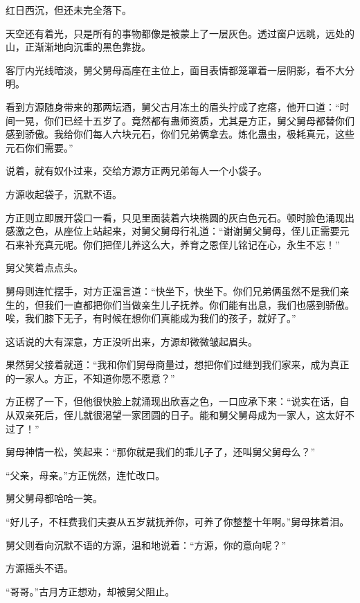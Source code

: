 
\begin{this_body}



红日西沉，但还未完全落下。

天空还有着光，只是所有的事物都像是被蒙上了一层灰色。透过窗户远眺，远处的山，正渐渐地向沉重的黑色靠拢。

客厅内光线暗淡，舅父舅母高座在主位上，面目表情都笼罩着一层阴影，看不大分明。

看到方源随身带来的那两坛酒，舅父古月冻土的眉头拧成了疙瘩，他开口道：“时间一晃，你们已经十五岁了。竟然都有蛊师资质，尤其是方正，舅父舅母都替你们感到骄傲。我给你们每人六块元石，你们兄弟俩拿去。炼化蛊虫，极耗真元，这些元石你们需要。”

说着，就有奴仆过来，交给方源方正两兄弟每人一个小袋子。

方源收起袋子，沉默不语。

方正则立即展开袋口一看，只见里面装着六块椭圆的灰白色元石。顿时脸色涌现出感激之色，从座位上站起来，对舅父舅母行礼道：“谢谢舅父舅母，侄儿正需要元石来补充真元呢。你们把侄儿养这么大，养育之恩侄儿铭记在心，永生不忘！”

舅父笑着点点头。

舅母则连忙摆手，对方正温言道：“快坐下，快坐下。你们兄弟俩虽然不是我们亲生的，但我们一直都把你们当做亲生儿子抚养。你们能有出息，我们也感到骄傲。唉，我们膝下无子，有时候在想你们真能成为我们的孩子，就好了。”

这话说的大有深意，方正没听出来，方源却微微皱起眉头。

果然舅父接着就道：“我和你们舅母商量过，想把你们过继到我们家来，成为真正的一家人。方正，不知道你愿不愿意？”

方正楞了一下，但他很快脸上就涌现出欣喜之色，一口应承下来：“说实在话，自从双亲死后，侄儿就很渴望一家团圆的日子。能和舅父舅母成为一家人，这太好不过了！”

舅母神情一松，笑起来：“那你就是我们的乖儿子了，还叫舅父舅母么？”

“父亲，母亲。”方正恍然，连忙改口。

舅父舅母都哈哈一笑。

“好儿子，不枉费我们夫妻从五岁就抚养你，可养了你整整十年啊。”舅母抹着泪。

舅父则看向沉默不语的方源，温和地说着：“方源，你的意向呢？”

方源摇头不语。

“哥哥。”古月方正想劝，却被舅父阻止。


\end{this_body}
